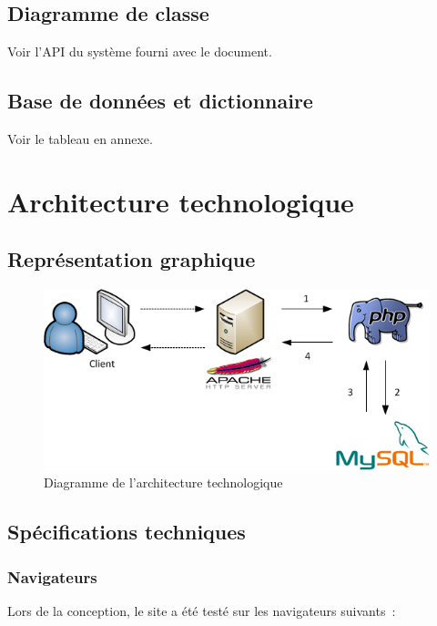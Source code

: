 \documentclass[letter, 11pt]{report}
\begin{document}
\section{Diagramme de classe}

Voir l'API du système fourni avec le document.

\section{Base de données et dictionnaire}

Voir le tableau en annexe.

\chapter{Architecture technologique}

\section{Représentation graphique}

\begin{figure}[htbp]
	\begin{center}
		\includegraphics[scale=0.75]{architectureTechnologique.png}
	\end{center}
	\caption{Diagramme de l'architecture technologique}
\end{figure}

\section{Spécifications techniques}


\subsection{Navigateurs}
Lors de la conception, le site a été testé sur les navigateurs suivants~:
\end{document}
